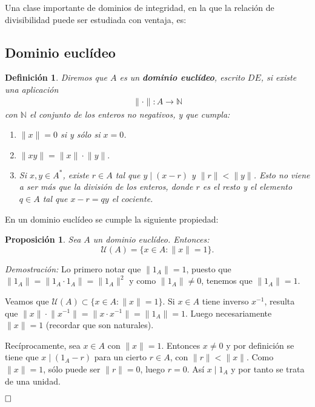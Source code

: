 \documentclass[12pt]{article}
\newtheorem{proposition}[theorem]{Proposición}
\newtheorem{definition}[theorem]{Definición}
\providecommand{\norm}[1]{\lVert#1\rVert}
\begin{document}
Una clase importante de dominios de integridad, en la que la relación de divisibilidad puede ser estudiada con ventaja, es:
\subsection{Dominio euclídeo}
\begin{definition} \label{eq:de} Diremos que $A$ es un \textbf{dominio euclídeo}, escrito $DE$, si existe una aplicación $$\begin{array}{rccl}
\norm{\cdot}\colon A\longrightarrow \mathbb{N}
\end{array}
$$
con $\mathbb{N}$ el conjunto de los enteros no negativos, y que cumpla: \begin{enumerate}
\item $\norm{x} = 0$ si y sólo si $x = 0$.
\item $\norm{xy} = \norm{x} \cdot \norm{y}.$
\item Si $x, y \in A^{\ast}$, existe $r \in A$ tal que $y \mid (x-r)$ y $\norm{r} < \norm{y}$. Esto no viene a ser más que la división de los enteros, donde $r$ es el resto y el elemento $q \in A$ tal que $x-r = qy$ el cociente. 
\end{enumerate}
\end{definition}

En un dominio euclídeo se cumple la siguiente propiedad:

\begin{proposition} Sea $A$ un dominio euclídeo. Entonces: $$\mathcal{U}(A) = \lbrace x \in A : \norm{x} = 1 \rbrace.$$
\end{proposition}
\emph{Demostración: } Lo primero notar que $\norm{1_{A}} = 1$, puesto que $\norm{1_{A}} = \norm{1_{A}\cdot 1_{A}} = \norm{1_{A}}^{2}$ y como $\norm{1_{A}} \neq 0$, tenemos que $\norm{1_{A}} = 1$.

Veamos que $\mathcal{U}(A) \subset \lbrace x \in A : \norm{x} = 1 \rbrace$. Si $x \in A$ tiene inverso $x^{-1}$, resulta que $\norm{x} \cdot \norm{x^{-1}} = \norm{x\cdot x^{-1}} = \norm{1_{A}} = 1.$ Luego necesariamente $\norm{x} = 1$ (recordar que son naturales).

Recíprocamente, sea $x \in A$ con $\norm{x} = 1$. Entonces $x \neq 0$ y por definición se tiene que $x \mid (1_{A}-r)$ para un cierto $r \in A$, con $\norm{r} < \norm{x}.$ Como $\norm{x} = 1$, sólo puede ser $\norm{r} = 0$, luego $r = 0$. Así $x \mid 1_{A}$ y por tanto se trata de una unidad. 
 
$\hfill \square$
\end{document}
